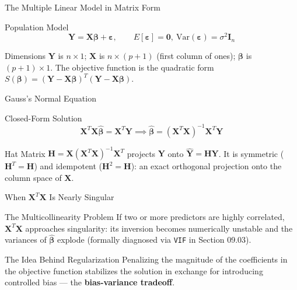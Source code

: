 \documentclass[10pt, aspectratio=169]{beamer}
\begin{document}
\begin{frame}{The Multiple Linear Model in Matrix Form}
  \footnotesize
  \begin{block}{Population Model}
    $$\mathbf{Y}=\mathbf{X}\boldsymbol\beta+\boldsymbol\varepsilon, \qquad E[\boldsymbol\varepsilon]=\mathbf{0},\ \text{Var}(\boldsymbol\varepsilon)=\sigma^2\mathbf{I}_n$$
  \end{block}
  \pause

  \vspace{0.1cm}
  \begin{alertblock}{Dimensions}
    $\mathbf{Y}$ is $n\times1$; $\mathbf{X}$ is $n\times(p+1)$ (first column of ones); $\boldsymbol\beta$ is $(p+1)\times1$. The objective function is the quadratic form $S(\boldsymbol\beta)=(\mathbf{Y}-\mathbf{X}\boldsymbol\beta)^T(\mathbf{Y}-\mathbf{X}\boldsymbol\beta)$.
  \end{alertblock}
\end{frame}

\begin{frame}{Gauss's Normal Equation}
  \footnotesize
  \begin{block}{Closed-Form Solution}
    $$\mathbf{X}^T\mathbf{X}\hat{\boldsymbol\beta}=\mathbf{X}^T\mathbf{Y} \implies \hat{\boldsymbol\beta}=(\mathbf{X}^T\mathbf{X})^{-1}\mathbf{X}^T\mathbf{Y}$$
  \end{block}
  \pause

  \vspace{0.1cm}
  \begin{alertblock}{Hat Matrix}
    $\mathbf{H}=\mathbf{X}(\mathbf{X}^T\mathbf{X})^{-1}\mathbf{X}^T$ projects $\mathbf{Y}$ onto $\hat{\mathbf{Y}}=\mathbf{H}\mathbf{Y}$. It is symmetric ($\mathbf{H}^T=\mathbf{H}$) and idempotent ($\mathbf{H}^2=\mathbf{H}$): an exact orthogonal projection onto the column space of $\mathbf{X}$.
  \end{alertblock}
\end{frame}

\begin{frame}{When $\mathbf{X}^T\mathbf{X}$ Is Nearly Singular}
  \footnotesize
  \begin{block}{The Multicollinearity Problem}
    If two or more predictors are highly correlated, $\mathbf{X}^T\mathbf{X}$ approaches singularity: its inversion becomes numerically unstable and the variances of $\hat{\boldsymbol\beta}$ explode (formally diagnosed via \texttt{VIF} in Section 09.03).
  \end{block}
  \pause

  \vspace{0.1cm}
  \begin{alertblock}{The Idea Behind Regularization}
    Penalizing the magnitude of the coefficients in the objective function stabilizes the solution in exchange for introducing controlled bias --- the \textbf{bias-variance tradeoff}.
  \end{alertblock}
\end{frame}
\end{document}
